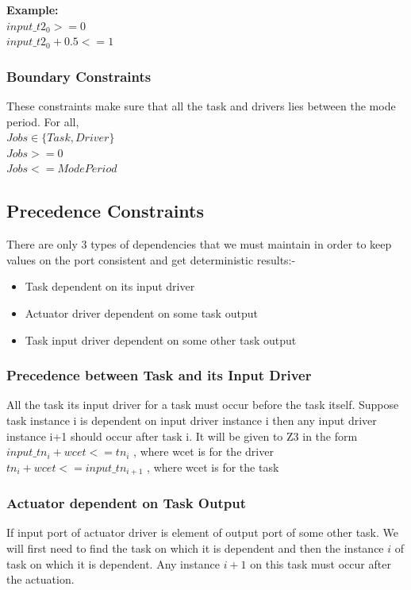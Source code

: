 \documentclass[16pt]{report}
\begin{document}
\noindent
\textbf{Example:}\\
    $input\_t2_0 >= 0$\\
    $input\_t2_0 + 0.5 <= 1$

\subsubsection{Boundary Constraints}
These constraints make sure that all the task and drivers lies between the mode period.
For all, \\ $ Jobs \in \{ Task, Driver\} $ \\
$ Jobs >= 0$\\
$ Jobs <= ModePeriod $


\subsection{Precedence Constraints}
There are only 3 types of dependencies that we must maintain in order to keep values on the port consistent and get deterministic results:-
\begin{itemize}
    \item Task dependent on its input driver
    \item Actuator driver dependent on some task output
    \item Task input driver dependent on some other task output
\end{itemize}

\subsubsection{Precedence between Task and its Input Driver}
All the task its input driver for a task must occur before the task itself. Suppose task instance i is dependent on input driver instance i then any input driver instance i+1 should occur after task i.
It will be given to Z3 in the form \\
$input\_tn_i + wcet <= tn_i$ ,  where wcet is for the driver\\
$tn_i + wcet <= input\_tn_{i+1}$ , where wcet is for the task


\subsubsection{Actuator dependent on Task Output}
If input port of actuator driver is element of output port of some other task. We will first need to find the task on which it is dependent and then the instance $i$ of task on which it is dependent. Any instance $i+1$ on this task must occur after the actuation.
\end{document}
